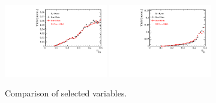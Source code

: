 \begin{figure}[h]
\includegraphics[height=!,width=0.4\textwidth]{figs/dataVsMC/run1vs2_norm/Ds2all_Bs_TAGOMEGA_OS.pdf}
\includegraphics[height=!,width=0.4\textwidth]{figs/dataVsMC/run1vs2_norm/Ds2all_Bs_SS_nnetKaon_PROB.pdf}


\caption{Comparison of selected variables.}
\label{fig:}
\end{figure}

